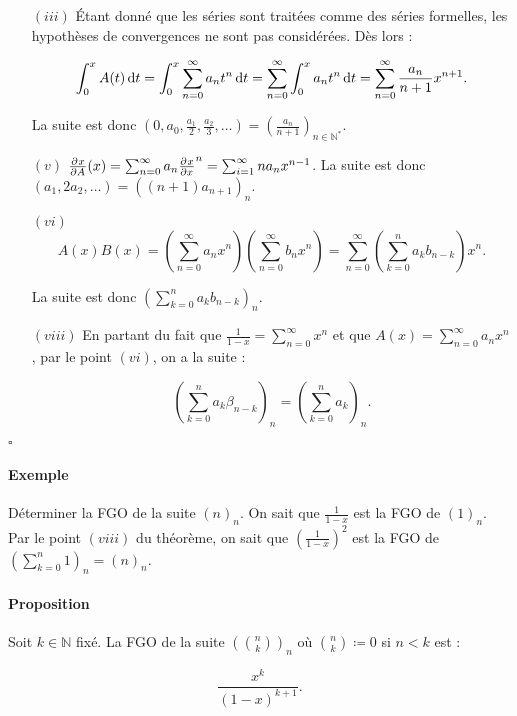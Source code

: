 \documentclass{article}
\begin{document}
			\begin{itemize}
				\item[$(iii)$]  Étant donné que les séries sont traitées comme des séries formelles, les hypothèses de convergences ne sont pas considérées. Dès lors :

				                \[\int_0^xA(t)\dif t = \int_0^x\sum_{n=0}^\infty a_nt^n\dif t = \sum_{n=0}^\infty\int_0^xa_nt^n\dif t = \sum_{n=0}^\infty\frac {a_n}{n+1}x^{n+1}.\]

								La suite est donc $\left(0, a_0, \frac {a_1}2, \frac {a_2}3, \ldots\right) = \left(\frac {a_n}{n+1}\right)_{n\in\mathbb N^*}$.
				\item[$(v)$]    $\pd xA(x) = \sum_{n=0}^\infty a_n\pd xx^n = \sum_{i=1}^\infty na_nx^{n-1}$. La suite est donc $(a_1, 2a_2, \ldots) = ((n+1)a_{n+1})_n$.
				\item[$(vi)$]   \[A(x)B(x) = \left(\sum_{n=0}^\infty a_nx^n\right)\left(\sum_{n=0}^\infty b_nx^n\right) = \sum_{n=0}^\infty \left(\sum_{k=0}^na_kb_{n-k}\right)x^n.\]

				                La suite est donc $\left(\sum_{k=0}^n a_kb_{n-k}\right)_n$.
				\item[$(viii)$] En partant du fait que $\frac 1{1-x} = \sum_{n=0}^\infty x^n$ et que $A(x) = \sum_{n=0}^\infty a_n x^n$, par le point $(vi)$, on a la suite :

				                \[\left(\sum_{k=0}^na_k\beta_{n-k}\right)_n = \left(\sum_{k=0}^na_k\right)_n.\]
			\end{itemize}

			\begin{flushright}$\square$\end{flushright}

			\paragraph{Exemple} Déterminer la FGO de la suite $(n)_n$. On sait que $\frac 1{1-x}$ est la FGO de $(1)_n$. Par le point $(viii)$ du théorème, on sait que
			$\left(\frac 1{1-x}\right)^2$ est la FGO de $\left(\sum_{k=0}^n1\right)_n = (n)_n$.

			\paragraph{Proposition} Soit $k \in \mathbb N$ fixé. La FGO de la suite $\left(\binom nk\right)_n$ où $\binom nk \coloneqq 0$ si $n < k$ est :

			\[\frac {x^k}{(1-x)^{k+1}}.\]
\end{document}
